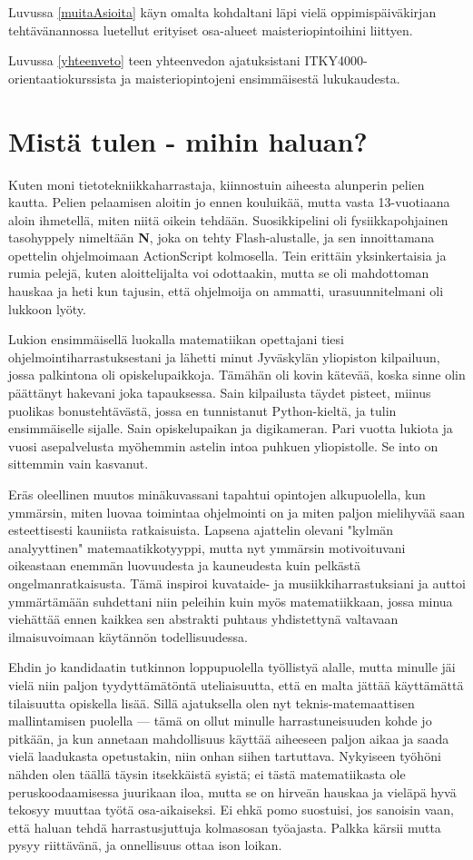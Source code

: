 \documentclass[utf8]{gradu3}
\begin{document}
Luvussa \ref{muitaAsioita} käyn omalta kohdaltani läpi vielä
oppimispäiväkirjan tehtävänannossa luetellut erityiset osa-alueet
maisteriopintoihini liittyen.

Luvussa \ref{yhteenveto} teen yhteenvedon ajatuksistani
ITKY4000-orientaatiokurssista ja maisteriopintojeni ensimmäisestä
lukukaudesta.

\chapter{Mistä tulen - mihin haluan?}
\label{taustatJaTavoitteet}

Kuten moni tietotekniikkaharrastaja, kiinnostuin aiheesta alunperin pelien
kautta. Pelien pelaamisen aloitin jo ennen kouluikää, mutta vasta
13-vuotiaana aloin ihmetellä, miten niitä oikein tehdään. Suosikkipelini oli
fysiikka\-pohjainen tasohyppely nimeltään \textbf{N}, joka on tehty
Flash-alustalle, ja sen innoittamana opettelin ohjelmoimaan ActionScript
kolmosella. Tein erittäin yksinkertaisia ja rumia pelejä, kuten
aloittelijalta voi odottaakin, mutta se oli mahdottoman hauskaa ja heti kun
tajusin, että ohjelmoija on ammatti, urasuunnitelmani oli lukkoon lyöty.

Lukion ensimmäisellä luokalla matematiikan opettajani tiesi
ohjelmointiharrastuksestani ja lähetti minut Jyväskylän yliopiston
kilpailuun, jossa palkintona oli opiskelupaikkoja. Tämähän oli kovin kätevää,
koska sinne olin päättänyt hakevani joka tapauksessa. Sain kilpailusta täydet
pisteet, miinus puolikas bonustehtävästä, jossa en tunnistanut Python-kieltä,
ja tulin ensimmäiselle sijalle. Sain opiskelupaikan ja digikameran. Pari
vuotta lukiota ja vuosi asepalvelusta myöhemmin astelin intoa puhkuen
yliopistolle. Se into on sittemmin vain kasvanut.

Eräs oleellinen muutos minäkuvassani tapahtui opintojen alkupuolella, kun
ymmärsin, miten luovaa toimintaa ohjelmointi on ja miten paljon mielihyvää
saan esteettisesti kauniista ratkaisuista. Lapsena ajattelin olevani "kylmän
analyyttinen" matemaatikkotyyppi, mutta nyt ymmärsin motivoituvani oikeastaan
enemmän luovuudesta ja kauneudesta kuin pelkästä ongelmanratkaisusta. Tämä
inspiroi kuvataide- ja musiikkiharrastuksiani ja auttoi ymmärtämään
suhdettani niin peleihin kuin myös matematiikkaan, jossa minua viehättää
ennen kaikkea sen abstrakti puhtaus yhdistettynä valtavaan ilmaisuvoimaan
käytännön todellisuudessa.

Ehdin jo kandidaatin tutkinnon loppupuolella työllistyä alalle, mutta minulle
jäi vielä niin paljon tyydyttämätöntä uteliaisuutta, että en malta jättää
käyttämättä tilaisuutta opiskella lisää. Sillä ajatuksella olen nyt
teknis-matemaattisen mallintamisen puolella — tämä on ollut minulle
harrastuneisuuden kohde jo pitkään, ja kun annetaan mahdollisuus käyttää
aiheeseen paljon aikaa ja saada vielä laadukasta opetustakin, niin onhan
sii\-hen tartuttava. Nykyiseen työhöni nähden olen täällä täysin itsekkäistä
syistä; ei tästä matematiikasta ole peruskoodaamisessa juurikaan iloa, mutta
se on hirveän hauskaa ja vieläpä hyvä tekosyy muuttaa työtä osa-aikaiseksi.
Ei ehkä pomo suostuisi, jos sanoisin vaan, että haluan tehdä harrastusjuttuja
kolmasosan työajasta. Palkka kärsii mutta pysyy riittävänä, ja onnellisuus
ottaa ison loikan.
\end{document}
